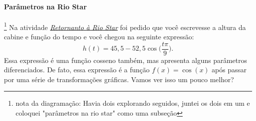 \label{trig-exp6}


\paragraph{Parâmetros na Rio Star}

\footnote{nota da diagramação: Havia dois explorando seguidos, juntei os dois em um e coloquei "parâmetros na rio star" como uma subseção}
Na atividade \hyperref[trig-ativ15]{\textit{Retornanto à Rio Star}} foi pedido que você escrevesse a altura da cabine e função do tempo e você chegou na seguinte expressão:
\begin{equation*}
h(t)=45{,}5-52{,}5\cos\bigg(\frac{t\pi}{9}\bigg).
\end{equation*}
Essa expressão é uma função cosseno também, mas apresenta alguns parâmetros diferenciados. De fato, essa expressão é a função $f(x)=\cos(x)$ após passar por uma série de transformações gráficas. Vamos ver isso um pouco melhor?

